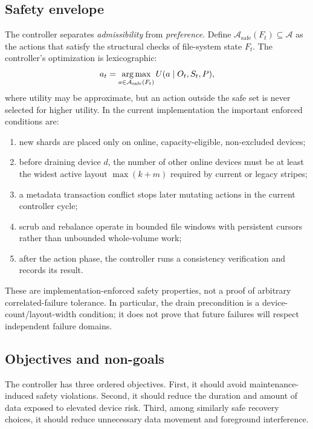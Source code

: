 \subsection{Safety envelope}
\label{sec:safety-envelope}
The controller separates \emph{admissibility} from \emph{preference}. Define $\mathcal{A}_{\mathrm{safe}}(F_t) \subseteq \mathcal{A}$ as the actions that satisfy the structural checks of file-system state $F_t$. The controller's optimization is lexicographic:
\begin{equation}
  a_t = \operatorname*{arg\,max}_{a \in \mathcal{A}_{\mathrm{safe}}(F_t)} U(a \mid O_t,S_t,P),
  \label{eq:safe-utility}
\end{equation}
where utility may be approximate, but an action outside the safe set is never selected for higher utility. In the current implementation the important enforced conditions are:
\begin{enumerate}[leftmargin=*]
  \item new shards are placed only on online, capacity-eligible, non-excluded devices;
  \item before draining device $d$, the number of other online devices must be at least the widest active layout $\max(k+m)$ required by current or legacy stripes;
  \item a metadata transaction conflict stops later mutating actions in the current controller cycle;
  \item scrub and rebalance operate in bounded file windows with persistent cursors rather than unbounded whole-volume work;
  \item after the action phase, the controller runs a consistency verification and records its result.
\end{enumerate}
These are implementation-enforced safety properties, not a proof of arbitrary correlated-failure tolerance. In particular, the drain precondition is a device-count/layout-width condition; it does not prove that future failures will respect independent failure domains.

\subsection{Objectives and non-goals}
The controller has three ordered objectives. First, it should avoid maintenance-induced safety violations. Second, it should reduce the duration and amount of data exposed to elevated device risk. Third, among similarly safe recovery choices, it should reduce unnecessary data movement and foreground interference.

